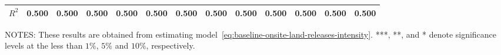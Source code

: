 \begin{table}[H]
{\begin{tabular}{@{}lllllllllllll@{}}
            $R^2$                                      & 0.500     & 0.500     & 0.500     & 0.500     & 0.500     & 0.500     & 0.500                & 0.500                & 0.500                & 0.500             & 0.500             & 0.500             \\ \bottomrule\bottomrule
        \end{tabular}%
    }
    \begin{minipage}{\columnwidth}
        \vspace{0.05in}
        \tiny NOTES: These results are obtained from estimating model~\ref{eq:baseline-onsite-land-releases-intensity}. ***, **, and * denote significance levels at the less than $1\%$, $5\%$ and $10\%$, respectively.
    \end{minipage}
\end{table}